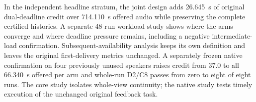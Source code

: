 In the independent headline stratum, the joint design adds 26.645~s of
original dual-deadline credit over 714.110~s offered audio while preserving
the complete certified histories. A separate 48-run workload study shows
where the arms converge and where deadline pressure remains, including a
negative intermediate-load confirmation. Subsequent-availability analysis
keeps its own definition and leaves the original first-delivery metrics
unchanged. A separately frozen native confirmation on four previously
unused speakers raises credit from 37.0 to all 66.340~s offered per arm
and whole-run D2/C8 passes from zero to eight of eight runs.
The core study isolates whole-view continuity; the native study tests
timely execution of the unchanged original feedback task.
